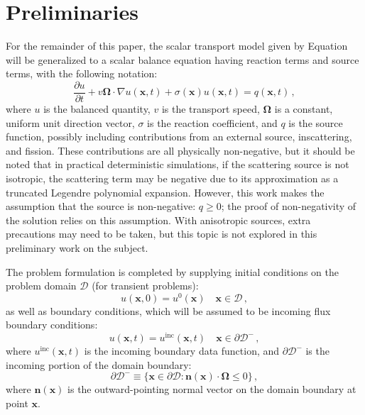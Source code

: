 \documentclass[xchauthor,chkrefs,fixeqskip,GCNS,amsmath,amsthm]{yjcphg}
\theoremstyle{remark}
\newcommand{\di}{\bm{\Omega}}
\begin{document}
\section{Preliminaries}%
\label{sec:preliminaries}
For the remainder of this paper, the scalar transport model given by
Equation~ will be generalized to a scalar
balance equation having reaction terms and source terms, with the
following notation:
%
\begin{equation}
\label{eq:scalar_model}
\frac{\partial u}{\partial t} + v\di\cdot\nabla u(\mathbf{x},t)+
\sigma(\mathbf{x}) u(\mathbf{x},t)= q(\mathbf{x},t)\,,
\end{equation}
%
where $u$ is the balanced quantity, $v$ is the transport speed,
$\di$ is a constant, uniform unit direction vector, $\sigma$ is the
reaction coefficient, and $q$ is the source function, possibly including
contributions from an external source, inscattering, and fission. These
contributions are all physically non-negative, but it should be noted
that in practical deterministic simulations, if the scattering source
is not isotropic, the scattering term may be negative due to its
approximation as a truncated Legendre polynomial expansion. However,
this work makes the assumption that the source is non-negative:
$q \ge0$; the proof of non-negativity of the solution relies on this
assumption. With anisotropic sources, extra precautions may need to be
taken, but this topic is not explored in this preliminary work on the
subject.

The problem formulation is completed by supplying initial conditions on
the problem domain $\mathcal{D}$ (for transient problems):
%
\begin{equation}
u(\mathbf{x},0) = u^{0}(\mathbf{x}) \quad\mathbf{x}\in\mathcal
{D}\,,
\end{equation}
%
as well as boundary conditions, which will be assumed to be incoming
flux boundary conditions:
%
\begin{equation}
u(\mathbf{x},t)= u^{\text{inc}}(\mathbf{x},t)\quad\mathbf{x}\in
\partial\mathcal{D}^{-} \,,
\end{equation}
%
where $u^{\text{inc}}(\mathbf{x},t)$ is the incoming boundary data
function, and $\partial\mathcal{D}^{-}$ is the incoming portion of the
domain boundary:
%
\begin{equation}
\partial\mathcal{D}^{-} \equiv\{ \mathbf{x}\in\partial\mathcal{D}:
\mathbf{n}(\mathbf{x})\cdot\di\leq0 \} \,,
\end{equation}
%
where $\mathbf{n}(\mathbf{x})$ is the outward-pointing normal vector on
the domain boundary at point $\mathbf{x}$.
\end{document}
